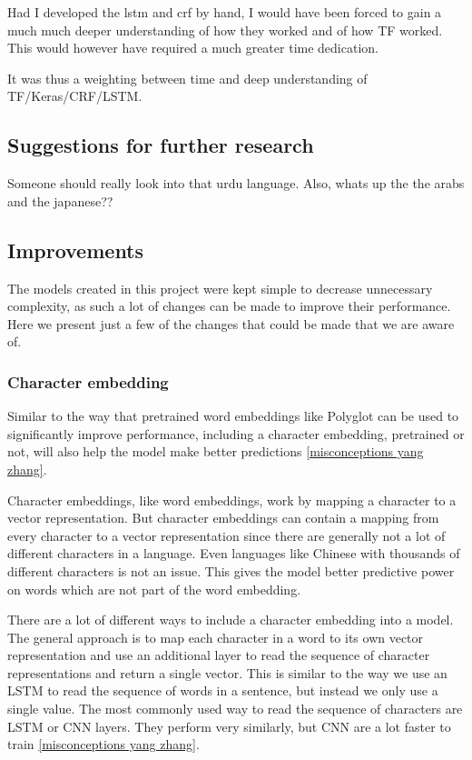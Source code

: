 Had I developed the lstm and crf by hand, I would have been forced to gain a much much deeper understanding of how they worked and of how TF worked. This would however have required a much greater time dedication.

It was thus a weighting between time and deep understanding of TF/Keras/CRF/LSTM.


\subsection{Suggestions for further research}

Someone should really look into that urdu language. Also, whats up the the arabs
and the japanese??

\subsection{Improvements}

The models created in this project were kept simple to decrease unnecessary
complexity, as such a lot of changes can be made to improve their performance.
Here we present just a few of the changes that could be made that we are aware
of.

\subsubsection{Character embedding}

Similar to the way that pretrained word embeddings like Polyglot can be used to
significantly improve performance, including a character embedding, pretrained
or not, will also help the model make better predictions \ref{misconceptions
yang zhang}.

Character embeddings, like word embeddings, work by mapping a character to a
vector representation. But character embeddings can contain a mapping from every
character to a vector representation since there are generally not a lot of
different characters in a language. Even languages like Chinese with thousands
of different characters is not an issue. This gives the model better predictive
power on words which are not part of the word embedding.

There are a lot of different ways to include a character embedding into a model.
The general approach is to map each character in a word to its own vector
representation and use an additional layer to read the sequence of character
representations and return a single vector. This is similar to the way we use an
LSTM to read the sequence of words in a sentence, but instead we only use a
single value. The most commonly used way to read the sequence of characters are
LSTM or CNN layers. They perform very similarly, but CNN are a lot faster to
train \ref{misconceptions yang zhang}.

